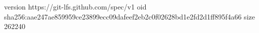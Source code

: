 version https://git-lfs.github.com/spec/v1
oid sha256:aae247ae859959ce23899ecc09dafeef2eb2c0f02628bd1e2fd2d1ff895f4a66
size 262240
